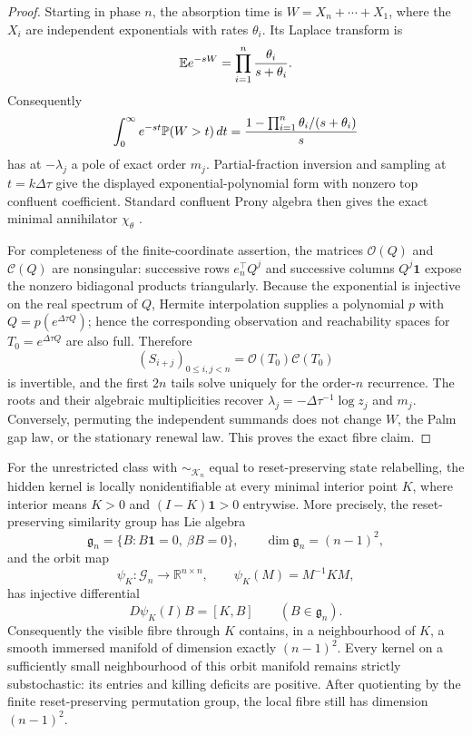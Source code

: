 \begin{proof}
Starting in phase \(n\), the absorption time is
\(W=X_n+\cdots+X_1\), where the \(X_i\) are independent exponentials with
rates \(\theta_i\). Its Laplace transform is
\[
\mathbb{E} e^{-sW}=\prod_{i=1}^n\frac{\theta_i}{s+\theta_i}.
\]
Consequently
\[
\int_0^\infty e^{-st}\mathbb{P}(W>t)\,dt
=\frac{1-\prod_{i=1}^n\theta_i/(s+\theta_i)}{s}
\]
has at
\(-\lambda_j\) a pole of exact order \(m_j\). Partial-fraction inversion and
sampling at \(t=k\Delta\tau\) give the displayed exponential-polynomial form
with nonzero top confluent coefficient. Standard confluent Prony algebra
then gives the exact minimal annihilator \(\chi_\theta\)
\cite{KunisRoemerVonDerOhe2020Prony}.

For completeness of the finite-coordinate assertion, the matrices
\(\mathcal O(Q)\) and \(\mathcal C(Q)\) are nonsingular: successive rows
\(e_n^\top Q^j\) and successive columns \(Q^j\mathbf1\) expose the nonzero
bidiagonal products triangularly. Because the exponential is injective on
the real spectrum of \(Q\), Hermite interpolation supplies a polynomial
\(p\) with \(Q=p(e^{\Delta\tau Q})\); hence the corresponding observation and
reachability spaces for \(T_0=e^{\Delta\tau Q}\) are also full. Therefore
\[
(S_{i+j})_{0\le i,j<n}=\mathcal O(T_0)\mathcal C(T_0)
\]
is invertible, and the first \(2n\) tails solve uniquely for the order-\(n\)
recurrence. The roots and their algebraic multiplicities recover
\(\lambda_j=-\Delta\tau^{-1}\log z_j\) and \(m_j\). Conversely, permuting
the independent summands does not change \(W\), the Palm gap law, or the
stationary renewal law. This proves the exact fibre claim.
\end{proof}

\begin{theorem}
\label{thm:nstate-interior-continuum-nonidentifiability-main}
For the unrestricted class with \(\sim_{\mathcal K_n}\) equal to
reset-preserving state relabelling, the hidden kernel is locally
nonidentifiable at every minimal interior point \(K\), where interior means
\(K>0\) and \((I-K)\mathbf1>0\) entrywise. More precisely, the
reset-preserving similarity group has Lie algebra
\[
\mathfrak g_n=\{B:B\mathbf1=0,\ \beta B=0\},
\qquad \dim\mathfrak g_n=(n-1)^2,
\]
and the orbit map
\[
\psi_K:\mathcal G_n\longrightarrow\mathbb R^{n\times n},\qquad
\psi_K(M)=M^{-1}KM,
\]
has injective differential
\[
D\psi_K(I)B=[K,B]\qquad(B\in\mathfrak g_n).
\]
Consequently the visible fibre through \(K\) contains, in a neighbourhood of
\(K\), a smooth immersed manifold of dimension exactly \((n-1)^2\).  Every
kernel on a sufficiently small neighbourhood of this orbit manifold remains
strictly substochastic: its entries and killing deficits are positive.  After
quotienting by the finite reset-preserving permutation group, the local fibre
still has dimension \((n-1)^2\).
\end{theorem}

